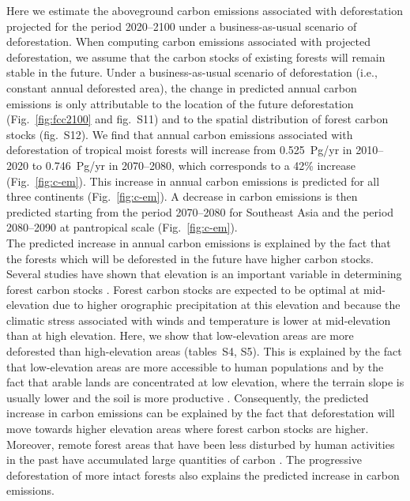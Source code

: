 \documentclass[
  12pt,
]{article}
\begin{document}
Here we estimate the aboveground carbon emissions associated with deforestation projected for the period 2020--2100 under a business-as-usual scenario of deforestation. When computing carbon emissions associated with projected deforestation, we assume that the carbon stocks of existing forests will remain stable in the future. Under a business-as-usual scenario of deforestation (i.e., constant annual deforested area), the change in predicted annual carbon emissions is only attributable to the location of the future deforestation (Fig.~\ref{fig:fcc2100} and fig.~S11) and to the spatial distribution of forest carbon stocks (fig.~S12). We find that annual carbon emissions associated with deforestation of tropical moist forests will increase from 0.525~Pg/yr in 2010--2020 to 0.746~Pg/yr in 2070--2080, which corresponds to a 42\% increase (Fig.~\ref{fig:c-em}). This increase in annual carbon emissions is predicted for all three continents (Fig.~\ref{fig:c-em}). A decrease in carbon emissions is then predicted starting from the period 2070--2080 for Southeast Asia and the period 2080--2090 at pantropical scale (Fig.~\ref{fig:c-em}).\\

The predicted increase in annual carbon emissions is explained by the fact that the forests which will be deforested in the future have higher carbon stocks. Several studies have shown that elevation is an important variable in determining forest carbon stocks \citep{Vieilledent2016, Saatchi2011}. Forest carbon stocks are expected to be optimal at mid-elevation \citep{Vieilledent2016} due to higher orographic precipitation at this elevation and because the climatic stress associated with winds and temperature is lower at mid-elevation than at high elevation. Here, we show that low-elevation areas are more deforested than high-elevation areas (tables~S4, S5). This is explained by the fact that low-elevation areas are more accessible to human populations and by the fact that arable lands are concentrated at low elevation, where the terrain slope is usually lower and the soil is more productive \citep{Geist2002}. Consequently, the predicted increase in carbon emissions can be explained by the fact that deforestation will move towards higher elevation areas where forest carbon stocks are higher. Moreover, remote forest areas that have been less disturbed by human activities in the past have accumulated large quantities of carbon \citep{Dargie2017, Brinck2017}. The progressive deforestation of more intact forests also explains the predicted increase in carbon emissions.\\
\end{document}
